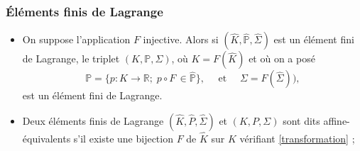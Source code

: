 \documentclass{beamer}
\begin{document}
\begin{frame}
\frametitle{Éléments finis de Lagrange}

 \begin{itemize}
 
\item On suppose l'application $F$ injective. Alors si $(\widehat{K}, \widehat{\mathbb{P}}, \widehat{\Sigma})$ est un élément fini de Lagrange, le triplet $(K, \mathbb{P}, \Sigma)$, où $K=F(\widehat{K})$ et où 
on a posé
\begin{equation}
\mathbb{P}=\{p:K\to\mathbb{R};\; p\circ F\,\in \widehat{\mathbb{P}}\},\quad\mbox{ et }\quad\Sigma = F(\widehat{\Sigma})),
\label{transformation}
\end{equation}
est un élément fini de Lagrange.
\item Deux éléments finis de Lagrange $(\widehat{K},\widehat{P},\widehat{\Sigma})$ et $(K, P, \Sigma)$ sont dits affine-équivalents s'il existe une bijection $F$ de $\widehat{K}$ sur $K$ vérifiant \eqref{transformation} ; 
 \end{itemize}

\end{frame}

%
%
%
\end{document}

